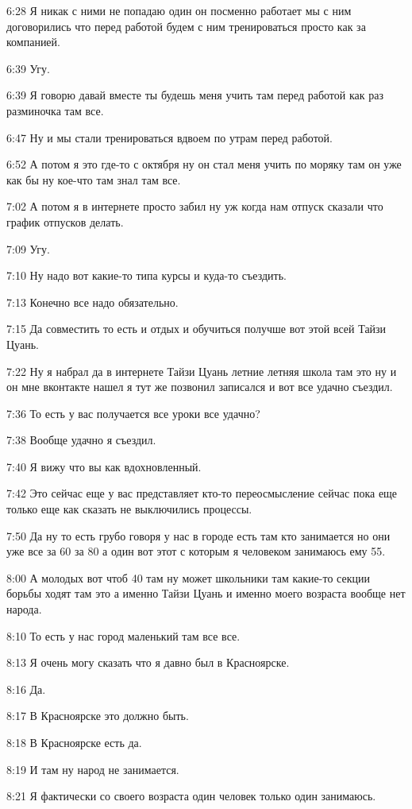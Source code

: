 6:28
Я никак с ними не попадаю один он посменно работает мы с ним договорились что перед работой будем с ним тренироваться просто как за компанией.

6:39
Угу.

6:39
Я говорю давай вместе ты будешь меня учить там перед работой как раз разминочка там все.

6:47
Ну и мы стали тренироваться вдвоем по утрам перед работой.

6:52
А потом я это где-то с октября ну он стал меня учить по моряку там он уже как бы ну кое-что там знал там все.

7:02
А потом я в интернете просто забил ну уж когда нам отпуск сказали что график отпусков делать.

7:09
Угу.

7:10
Ну надо вот какие-то типа курсы и куда-то съездить.

7:13
Конечно все надо обязательно.

7:15
Да совместить то есть и отдых и обучиться получше вот этой всей Тайзи Цуань.

7:22
Ну я набрал да в интернете Тайзи Цуань летние летняя школа там это ну и он мне вконтакте нашел я тут же позвонил записался и вот все удачно съездил.

7:36
То есть у вас получается все уроки все удачно?

7:38
Вообще удачно я съездил.

7:40
Я вижу что вы как вдохновленный.

7:42
Это сейчас еще у вас представляет кто-то переосмысление сейчас пока еще только еще как сказать не выключились процессы.

7:50
Да ну то есть грубо говоря у нас в городе есть там кто занимается но они уже все за 60 за 80 а один вот этот с которым я человеком занимаюсь ему 55.

8:00
А молодых вот чтоб 40 там ну может школьники там какие-то секции борьбы ходят там это а именно Тайзи Цуань и именно моего возраста вообще нет народа.

8:10
То есть у нас город маленький там все все.

8:13
Я очень могу сказать что я давно был в Красноярске.

8:16
Да.

8:17
В Красноярске это должно быть.

8:18
В Красноярске есть да.

8:19
И там ну народ не занимается.

8:21
Я фактически со своего возраста один человек только один занимаюсь.

